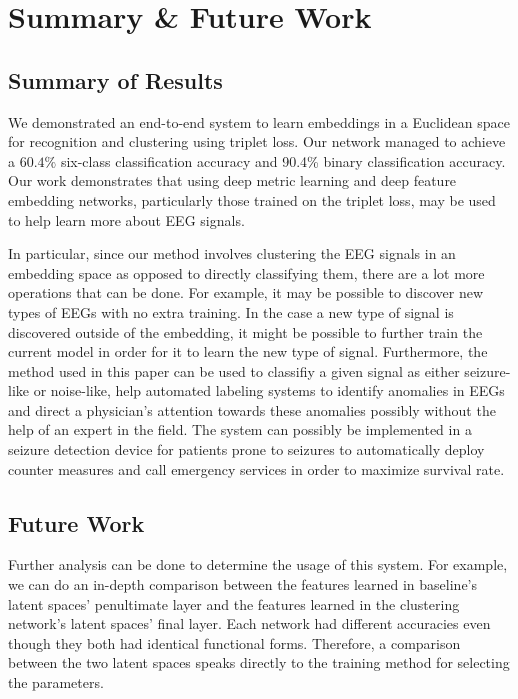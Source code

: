 \chapter{Summary \& Future Work}

\section*{Summary of Results}
We demonstrated an end-to-end system to learn embeddings in a Euclidean space for recognition and clustering using triplet loss. Our network managed to achieve a $60.4\%$ six-class classification accuracy and 90.4\% binary classification accuracy. Our work demonstrates that using deep metric learning and deep feature embedding networks, particularly those trained on the triplet loss, may be used to help learn more about EEG signals. 

In particular, since our method involves clustering the EEG signals in an embedding space as opposed to directly classifying them, there are a lot more operations that can be done. For example, it may be possible to discover new types of EEGs with no extra training. In the case a new type of signal is discovered outside of the embedding, it might be possible to further train the current model in order for it to learn the new type of signal. Furthermore, the method used in this paper can be used to classifiy a given signal as either seizure-like or noise-like, help automated labeling systems to identify anomalies in EEGs and direct a physician's attention towards these anomalies possibly without the help of an expert in the field. The system can possibly be implemented in a seizure detection device for patients prone to seizures to automatically deploy counter measures and call emergency services in order to maximize survival rate.

\section*{Future Work}

Further analysis can be done to determine the usage of this system. For example, we can do an in-depth comparison between the features learned in baseline's latent spaces' penultimate layer and the features learned in the clustering network's latent spaces' final layer. Each network had different accuracies even though they both had identical functional forms. Therefore, a comparison between the two latent spaces speaks directly to the training method for selecting the parameters. 

